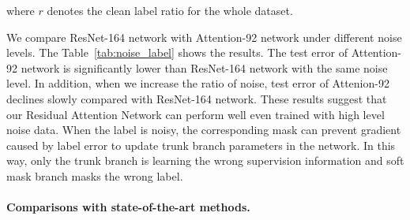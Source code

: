 \documentclass[10pt,twocolumn,letterpaper]{article}
\begin{document}
%
\noindent
where $r$ denotes the clean label ratio for the whole dataset.

We compare ResNet-164 network with Attention-92 network under different noise levels.
%
The Table~\ref{tab:noise_label} shows the results.
%
The test error of Attention-92 network is significantly lower than ResNet-164 network with the same noise level.
%
In addition, when we increase the ratio of noise, test error of Attenion-92 declines slowly compared with ResNet-164 network.
%
These results suggest that our Residual Attention Network can perform well even trained with high level noise data.
%
%
When the label is noisy, the corresponding mask can prevent gradient caused by label error to update trunk branch parameters in the network.
%
In this way, only the trunk branch is learning the wrong supervision information and soft mask branch masks the wrong label.


\paragraph{Comparisons with state-of-the-art methods.}
\begin{table}\small
\setlength{\abovecaptionskip}{0pt}
\setlength{\belowcaptionskip}{-5pt}
\begin{center}
\end{center}
\caption{Comparisons with state-of-the-art methods on CIFAR-10/100. $\dag$: the Attention-452 consists of Attention Module with hyper-parameters setting: $\{p=2$, $t=4$, $r=3\}$ and 6 Attention Modules per stage. }
\label{tab:cifar_results}
\end{table}
\end{document}
